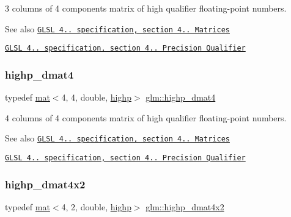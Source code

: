 3 columns of 4 components matrix of high qualifier floating-\/point numbers.

\begin{DoxySeeAlso}{See also}
\href{http://www.opengl.org/registry/doc/GLSLangSpec.4.20.8.pdf}{\tt G\+L\+SL 4.. specification, section 4.. Matrices} 

\href{http://www.opengl.org/registry/doc/GLSLangSpec.4.20.8.pdf}{\tt G\+L\+SL 4.. specification, section 4.. Precision Qualifier} 
\end{DoxySeeAlso}
\mbox{\label{group__core__precision_ga878bb8f4881dbf688ab9bbb5e2944a54}} 
\subsubsection{\texorpdfstring{highp\+\_\+dmat4}{highp\_dmat4}}
{\footnotesize\ttfamily typedef \mbox{\hyperlink{structglm_1_1mat}{mat}}$<$4, 4, double, \mbox{\hyperlink{namespaceglm_a36ed105b07c7746804d7fdc7cc90ff25ac6f7eab42eacbb10d59a58e95e362074}{highp}}$>$ \mbox{\hyperlink{group__core__precision_ga878bb8f4881dbf688ab9bbb5e2944a54}{glm\+::highp\+\_\+dmat4}}}

4 columns of 4 components matrix of high qualifier floating-\/point numbers.

\begin{DoxySeeAlso}{See also}
\href{http://www.opengl.org/registry/doc/GLSLangSpec.4.20.8.pdf}{\tt G\+L\+SL 4.. specification, section 4.. Matrices} 

\href{http://www.opengl.org/registry/doc/GLSLangSpec.4.20.8.pdf}{\tt G\+L\+SL 4.. specification, section 4.. Precision Qualifier} 
\end{DoxySeeAlso}
\mbox{\label{group__core__precision_ga22c6b4fe5bb2e33a3cfa1c026803dd68}} 
\subsubsection{\texorpdfstring{highp\+\_\+dmat4x2}{highp\_dmat4x2}}
{\footnotesize\ttfamily typedef \mbox{\hyperlink{structglm_1_1mat}{mat}}$<$4, 2, double, \mbox{\hyperlink{namespaceglm_a36ed105b07c7746804d7fdc7cc90ff25ac6f7eab42eacbb10d59a58e95e362074}{highp}}$>$ \mbox{\hyperlink{group__core__precision_ga22c6b4fe5bb2e33a3cfa1c026803dd68}{glm\+::highp\+\_\+dmat4x2}}}

